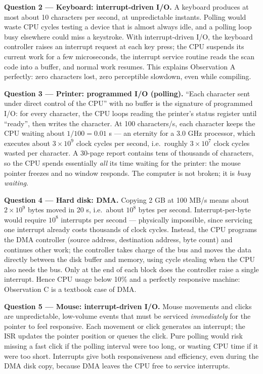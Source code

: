 \documentclass[11pt]{article}
\newcommand{\cle}[1]{{\popxbold\color{popdark}#1}}
\begin{document}
\textbf{Question 2 --- Keyboard: interrupt-driven I/O.} A keyboard produces at most about 10 characters per second, at unpredictable instants. Polling would waste CPU cycles testing a device that is almost always idle, and a polling loop busy elsewhere could miss a keystroke. With interrupt-driven I/O, the keyboard controller raises an \cle{interrupt request} at each key press; the CPU suspends its current work for a few microseconds, the interrupt service routine reads the scan code into a buffer, and normal work resumes. This explains Observation A perfectly: zero characters lost, zero perceptible slowdown, even while compiling.

\textbf{Question 3 --- Printer: programmed I/O (polling).} ``Each character sent under direct control of the CPU'' with no buffer is the signature of \cle{programmed I/O}: for every character, the CPU loops reading the printer's status register until ``ready'', then writes the character. At 100 characters/s, each character keeps the CPU waiting about $1/100 = 0.01$ s --- an eternity for a 3.0 GHz processor, which executes about $3 \times 10^{9}$ clock cycles per second, i.e.\ roughly $3 \times 10^{7}$ clock cycles wasted per character. A 30-page report contains tens of thousands of characters, so the CPU spends essentially \emph{all} its time waiting for the printer: the mouse pointer freezes and no window responds. The computer is not broken; it is \emph{busy waiting}.

\textbf{Question 4 --- Hard disk: DMA.} Copying 2 GB at 100 MB/s means about $2 \times 10^{9}$ bytes moved in 20 s, i.e.\ about $10^{8}$ bytes per second. Interrupt-per-byte would require $10^{8}$ interrupts per second --- physically impossible, since servicing one interrupt already costs thousands of clock cycles. Instead, the CPU programs the \cle{DMA controller} (source address, destination address, byte count) and continues other work; the controller takes charge of the bus and moves the data directly between the disk buffer and memory, using \cle{cycle stealing} when the CPU also needs the bus. Only at the end of each block does the controller raise a single interrupt. Hence CPU usage below 10\% and a perfectly responsive machine: Observation C is a textbook case of DMA.

\textbf{Question 5 --- Mouse: interrupt-driven I/O.} Mouse movements and clicks are unpredictable, low-volume events that must be serviced \emph{immediately} for the pointer to feel responsive. Each movement or click generates an interrupt; the ISR updates the pointer position or queues the click. Pure polling would risk missing a fast click if the polling interval were too long, or wasting CPU time if it were too short. Interrupts give both responsiveness and efficiency, even during the DMA disk copy, because DMA leaves the CPU free to service interrupts.
\end{document}
